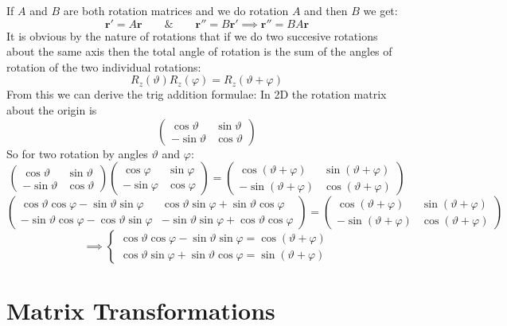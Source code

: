 \documentclass{article}
\renewcommand{\vec}[1]{\bm{#1}}
\newcommand{\vv}[1]{\vec{#1}}
\begin{document}
If \(A\) and \(B\) are both rotation matrices and we do rotation \(A\) and then \(B\) we get:
\[\vv r'=A\vv r\qquad\&\qquad\vv r''=B\vv r'\implies\vv r''=BA\vv r\]
It is obvious by the nature of rotations that if we do two succesive rotations about the same axis then the total angle of rotation is the sum of the angles of rotation of the two individual rotations:
\[R_z(\vartheta)R_z(\varphi)=R_z(\vartheta+\varphi)\]
From this we can derive the trig addition formulae:
In 2D the rotation matrix about the origin is
\[
\begin{pmatrix}
\cos\vartheta & \sin\vartheta\\
-\sin\vartheta & \cos\vartheta
\end{pmatrix}
\]
So for two rotation by angles \(\vartheta\) and \(\varphi\):
\[
\begin{pmatrix}
\cos\vartheta & \sin\vartheta\\
-\sin\vartheta & \cos\vartheta
\end{pmatrix}
\begin{pmatrix}
\cos\varphi & \sin\varphi\\
-\sin\varphi & \cos\varphi
\end{pmatrix}
=
\begin{pmatrix}
\cos(\vartheta+\varphi) & \sin(\vartheta+\varphi)\\
-\sin(\vartheta+\varphi) & \cos(\vartheta+\varphi)
\end{pmatrix}
\]
\[
\begin{pmatrix}
\cos\vartheta\cos\varphi-\sin\vartheta\sin\varphi & \cos\vartheta\sin\varphi+\sin\vartheta\cos\varphi\\
-\sin\vartheta\cos\varphi-\cos\vartheta\sin\varphi & -\sin\vartheta\sin\varphi+\cos\vartheta\cos\varphi
\end{pmatrix}
=
\begin{pmatrix}
\cos(\vartheta+\varphi) & \sin(\vartheta+\varphi)\\
-\sin(\vartheta+\varphi) & \cos(\vartheta+\varphi)
\end{pmatrix}
\]
\[\implies \left\{
\begin{array}{l}
\cos\vartheta\cos\varphi-\sin\vartheta\sin\varphi=\cos(\vartheta+\varphi)\\
\cos\vartheta\sin\varphi+\sin\vartheta\cos\varphi=\sin(\vartheta+\varphi)
\end{array}
\right.
\]

\section{Matrix Transformations}
\end{document}
